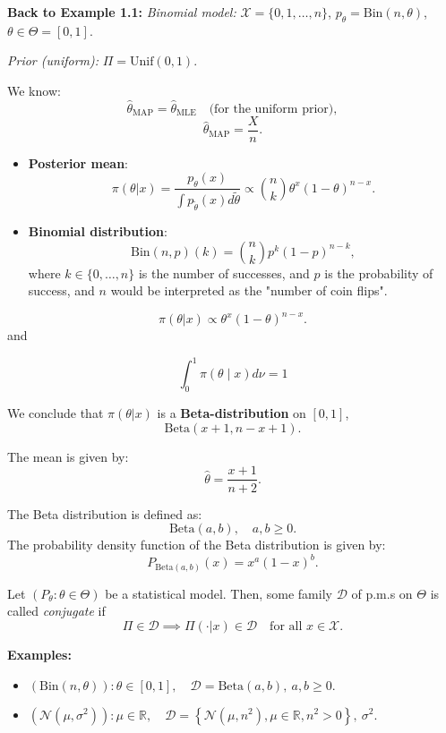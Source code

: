 \documentclass[open=any, 11pt,paper=A4]{scrreprt}
\begin{document}
\textbf{Back to Example 1.1:}  
\textit{Binomial model:} $\mathcal{X} = \{0, 1, \dots, n\}$,  
$p_\theta = \text{Bin}(n, \theta)$,  
$\theta \in \Theta = [0,1]$.  

\textit{Prior (uniform):} $\Pi = \text{Unif}(0,1)$.

We know: 
\[
\hat{\theta}_{\text{MAP}} = \hat{\theta}_{\text{MLE}} \quad \text{(for the uniform prior)},
\]
\[
\hat{\theta}_{\text{MAP}} = \frac{X}{n}.
\]

\begin{itemize}
    \item \textbf{Posterior mean}:
    \[
    \pi(\theta | x) = \frac{p_\theta(x)}
    {\int p_{\tilde{\theta}}(x) d\tilde{\theta}} \propto  \binom{n}{k} \theta^{x}(1-\theta)^{n-x}.
    \]
    
    \item \textbf{Binomial distribution}:
    \[
    \text{Bin}(n, p)(k) = \binom{n}{k} p^k (1-p)^{n-k},
    \]
    where \( k \in \{0, \ldots, n\} \) is the number of successes, and \( p \) is the probability of success, and $n$ would be interpreted as the "number of coin flips".
\end{itemize}

\[
\pi(\theta | x) \propto \theta^x (1-\theta)^{n-x}.
\]
and 

\[ \int_0^1 \pi(\theta \mid x) d\nu  =1\]

We conclude that \( \pi(\theta | x) \) is a \textbf{Beta-distribution} on \( [0,1] \),
\[
\text{Beta}(x+1, n-x+1).
\]

The mean is given by:
\[
\hat{\theta} = \frac{x+1}{n+2}.
\]

\begin{remark}
The Beta distribution is defined as:
\[
\text{Beta}(a, b), \quad a,b \geq 0.
\]
The probability density function of the Beta distribution is given by:
\[
P_{\text{Beta}(a,b)}(x) = x^{a}(1-x)^{b}.
\]
\end{remark}

\begin{definition}
Let \((P_\theta : \theta \in \Theta)\) be a statistical model. Then, some family \(\mathcal{D}\) of p.m.s on \(\Theta\) is called \textit{conjugate} if
\[
\Pi \in \mathcal{D} \implies \Pi(\cdot | x) \in \mathcal{D} \quad \text{for all } x \in \mathcal{X}.
\]
\end{definition}

\noindent \textbf{Examples:}
\begin{itemize}
    \item \((\text{Bin}(n, \theta)) : \theta \in [0,1], \quad \mathcal{D} = \text{Beta}(a,b), \ a,b \geq 0.\)
    \item \((\mathcal{N}(\mu, \sigma^2)) : \mu \in \mathbb{R}, \quad \mathcal{D} = \left\{\mathcal{N}\left(\mu, n^2\right), \mu \in \mathbb{R}, n^2 > 0 \right\}, \ \sigma^2 \).
\end{itemize}
\end{document}
